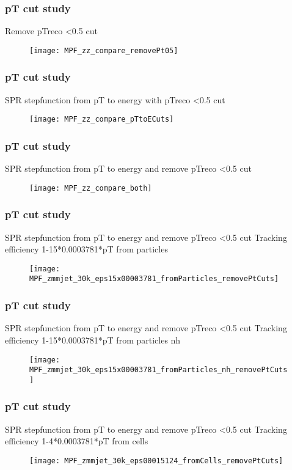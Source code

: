 \documentclass{beamer}
\begin{document}
\begin{frame}
\frametitle{pT cut study}
Remove pTreco \textless 0.5 cut 
\vspace{\baselineskip}
\begin{figure}[H]
\texttt{[image: MPF\_zz\_compare\_removePt05]}
\centering
\end{figure}
\end{frame}

\begin{frame}
\frametitle{pT cut study}
SPR stepfunction from pT to energy with pTreco \textless 0.5 cut 
\vspace{\baselineskip}
\begin{figure}[H]
\texttt{[image: MPF\_zz\_compare\_pTtoECuts]}
\centering
\end{figure}
\end{frame}

\begin{frame}
\frametitle{pT cut study}
SPR stepfunction from pT to energy and remove pTreco \textless 0.5 cut
\vspace{\baselineskip}
\begin{figure}[H]
\texttt{[image: MPF\_zz\_compare\_both]}
\centering
\end{figure}
\end{frame}

\begin{frame}
\frametitle{pT cut study}
SPR stepfunction from pT to energy and remove pTreco \textless 0.5 cut
Tracking efficiency 1-15*0.0003781*pT from particles
\begin{figure}[H]
\texttt{[image: MPF\_zmmjet\_30k\_eps15x00003781\_fromParticles\_removePtCuts]}
\centering
\end{figure}
\end{frame}


\begin{frame}
\frametitle{pT cut study}
SPR stepfunction from pT to energy and remove pTreco \textless 0.5 cut
Tracking efficiency 1-15*0.0003781*pT from particles nh
\begin{figure}[H]
\texttt{[image: MPF\_zmmjet\_30k\_eps15x00003781\_fromParticles\_nh\_removePtCuts]}
\centering
\end{figure}
\end{frame}


\begin{frame}
\frametitle{pT cut study}
SPR stepfunction from pT to energy and remove pTreco \textless 0.5 cut
Tracking efficiency 1-4*0.0003781*pT from cells
\begin{figure}[H]
\texttt{[image: MPF\_zmmjet\_30k\_eps00015124\_fromCells\_removePtCuts]}
\centering
\end{figure}
\end{frame}



\begin{frame}

\end{frame}
























 
\end{document}
